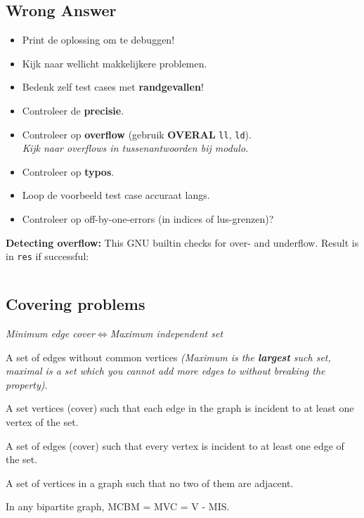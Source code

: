 \documentclass[8pt,a4paper,landscape,oneside]{amsart}
\newcommand{\mintedstyle}[2]{\inputminted[fontsize=\normalsize,baselinestretch=.9,breaklines,tabsize=2]{#1}{code/#2}}
\newcommand{\code}[1]{\mintedstyle{cpp}{#1}}
\newenvironment{myitemize}
{\begin{itemize}[leftmargin=.3cm]
	\setlength{\itemsep}{0pt}
	\setlength{\parskip}{0pt}
	\setlength{\parsep}{0pt}     }
{ \end{itemize}                  }
\begin{document}
\begin{multicols*}{3}
\subsection{Wrong Answer}

\begin{myitemize}
	\item Print de oplossing om te debuggen!
	\item Kijk naar wellicht makkelijkere problemen.
	\item Bedenk zelf test cases met \textbf{randgevallen}!
	\item Controleer de \textbf{precisie}.
	\item Controleer op \textbf{overflow} (gebruik \textbf{OVERAL} \texttt{ll}, \texttt{ld}).
		\\ \textit{Kijk naar overflows in tussenantwoorden bij modulo.}
	\item Controleer op \textbf{typo\textquotesingle s}.
	\item Loop de voorbeeld test case accuraat langs.
	\item Controleer op off-by-one-errors (in indices of lus-grenzen)?
\end{myitemize}

\textbf{Detecting overflow:}
This GNU builtin checks for over- and underflow. Result is in \texttt{res} if successful:
\code{other/overflow.cpp}

\subsection{Covering problems}

\begin{center}
	\emph{Minimum edge cover$\iff$Maximum independent set}
\end{center}

\begin{description}
	\setlength\itemsep{-.25em}
	\item[Matching]
		A set of edges without common vertices \textit{(Maximum is the \textbf{largest} such set, maximal is a set which you cannot add more edges to without breaking the property)}.
	\item[Minimum Vertex Cover]
		A set vertices (cover) such that each edge in the graph is incident to at least one vertex of the set.
	\item[Minimum Edge Cover]
		A set of edges (cover) such that every vertex is incident to at least one edge of the set.
	\item[Maximum Independent Set]
		A set of vertices in a graph such that no two of them are adjacent.
	\item[K\"{o}nig's theorem]
		In any bipartite graph, MCBM = MVC = V - MIS.
\end{description}


\end{multicols*}
\end{document}
